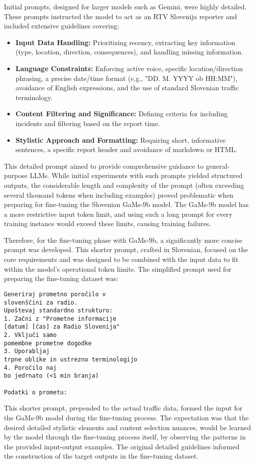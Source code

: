 \documentclass[fleqn,moreauthors,10pt]{ds_report}
\begin{document}
Initial prompts, designed for larger models such as Gemini, were highly detailed. These prompts instructed the model to act as an RTV Slovenija reporter and included extensive guidelines covering:
\begin{itemize}
    \item \textbf{Input Data Handling:} Prioritizing recency, extracting key information (type, location, direction, consequences), and handling missing information.
    \item \textbf{Language Constraints:} Enforcing active voice, specific location/direction phrasing, a precise date/time format (e.g., "DD. M. YYYY ob HH:MM"), avoidance of English expressions, and the use of standard Slovenian traffic terminology.
    \item \textbf{Content Filtering and Significance:} Defining criteria for including incidents and filtering based on the report time.
    \item \textbf{Stylistic Approach and Formatting:} Requiring short, informative sentences, a specific report header and avoidance of markdown or HTML.
\end{itemize}

This detailed prompt aimed to provide comprehensive guidance to general-purpose LLMs. While initial experiments with such prompts yielded structured outputs, the considerable length and complexity of the prompt (often exceeding several thousand tokens when including examples) proved problematic when preparing for fine-tuning the Slovenian GaMs-9b model. The GaMs-9b model has a more restrictive input token limit, and using such a long prompt for every training instance would exceed these limits, causing training failures.

Therefore, for the fine-tuning phase with GaMs-9b, a significantly more concise prompt was developed. This shorter prompt, crafted in Slovenian, focused on the core requirements and was designed to be combined with the input data to fit within the model's operational token limits. The simplified prompt used for preparing the fine-tuning dataset was:
\begin{verbatim}
Generiraj prometno poročilo v 
slovenščini za radio.
Upoštevaj standardno strukturo:
1. Začni z "Prometne informacije 
[datum] [čas] za Radio Slovenija"
2. Vključi samo 
pomembne prometne dogodke
3. Uporabljaj 
trpne oblike in ustrezno terminologijo
4. Poročilo naj 
bo jedrnato (<1 min branja)

Podatki o prometu:
\end{verbatim}
This shorter prompt, prepended to the actual traffic data, formed the input for the GaMs-9b model during the fine-tuning process. The expectation was that the desired detailed stylistic elements and content selection nuances, would be learned by the model through the fine-tuning process itself, by observing the patterns in the provided input-output examples. The original detailed guidelines informed the construction of the target outputs in the fine-tuning dataset.
\end{document}

